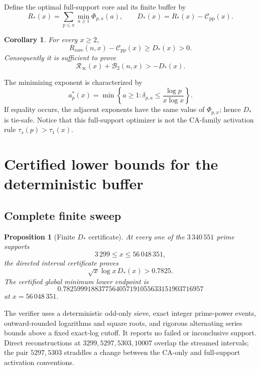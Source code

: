 \documentclass[11pt,a4paper]{article}
\numberwithin{equation}{section}
\newtheorem{proposition}[theorem]{Proposition}
\newtheorem{corollary}[theorem]{Corollary}
\theoremstyle{definition}
\newcommand{\Xmin}{3\,299}
\newcommand{\Xdirect}{56\,048\,351}
\newcommand{\Rinf}{\mathcal R_{\infty}}
\newcommand{\Btwo}{\mathcal B_{2}}
\newcommand{\Cpi}{\mathcal C_{\mathrm{pp}}}
\begin{document}
Define the optimal full-support core and its finite buffer by
\begin{equation}\label{eq:Dstar-def}
  R_*(x)=\sum_{p\le x}\min_{a\ge1}\Phi_{p,x}(a),
  \qquad
  D_*(x)=R_*(x)-\Cpi(x).
\end{equation}

\begin{corollary}\label{cor:Dstar-positive}
For every \(x\ge2\),
\[
  R_{\mathrm{core}}(n,x)-\Cpi(x)\ge D_*(x)>0.
\]
Consequently it is sufficient to prove
\begin{equation}\label{eq:residual-target}
  \Rinf(x)+\Btwo(n,x)>-D_*(x).
\end{equation}
\end{corollary}

The minimizing exponent is characterized by
\[
  a_p^*(x)
  =
  \min\left\{
  a\ge1:
  \delta_{p,a}\le\frac{\log p}{x\log x}
  \right\}.
\]
If equality occurs, the adjacent exponents have the same value of
\(\Phi_{p,x}\); hence \(D_*\) is tie-safe.  Notice that this
full-support optimizer is not the CA-family activation rule
\(\tau_s(p)>\tau_1(x)\).

\section{Certified lower bounds for the deterministic buffer}

\subsection{Complete finite sweep}

\begin{proposition}[Finite \(D_*\) certificate]\label{prop:Dstar-finite}
At every one of the \(3\,340\,551\) prime supports
\[
  \Xmin\le x\le\Xdirect,
\]
the directed interval certificate proves
\[
  \sqrt{x}\log x\,D_*(x)>0.7825.
\]
The certified global minimum lower endpoint is
\[
  0.7825999188377564057191055633151903716957
\]
at \(x=\Xdirect\).
\end{proposition}

The verifier uses a deterministic odd-only sieve, exact integer prime-power
events, outward-rounded logarithms and square roots, and rigorous alternating
series bounds above a fixed exact-log cutoff.  It reports no failed or
inconclusive support.  Direct reconstructions at
\(3299,5297,5303,10007\) overlap the streamed intervals; the pair
\(5297,5303\) straddles a change between the CA-only and full-support
activation conventions.
\end{document}
